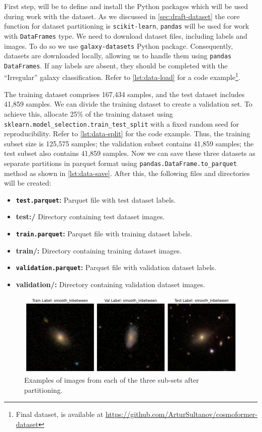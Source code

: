 First step, will be to define and install the Python packages which will be used during work with the dataset. As we discussed in \autoref{sec:draft-dataset} the core function for dataset partitioning is \texttt{scikit-learn}, \texttt{pandas} will be used for work with \texttt{DataFrames} type. We need to download dataset files, including labels and images. To do so we use \texttt{galaxy-datasets} Python package. Consequently, datasets are downloaded locally, allowing us to handle them using \texttt{pandas DataFrames}. If any labels are absent, they should be completed with the \enquote{Irregular} galaxy classification. Refer to \autoref{lst:data-load} for a code example\footnote{Final dataset, is available at \url{https://github.com/ArturSultanov/cosmoformer-dataset}}.

The training dataset comprises 167,434 samples, and the test dataset includes 41,859 samples. We can divide the training dataset to create a validation set. To achieve this, allocate 25\% of the training dataset using \texttt{sklearn.model\_selection.train\_test\_split} with a fixed random seed for reproducibility. Refer to  \autoref{lst:data-split} for the code example. Thus, the training subset size is 125,575 samples; the validation subset contains 41,859 samples; the test subset also contains 41,859 samples. Now we can save these three datasets as separate partitions in parquet format using \texttt{pandas.DataFrame.to\_parquet} method as shown in \autoref{lst:data-save}. After this, the following files and directories will be created:

\begin{itemize}
    \item \textbf{\texttt{test.parquet}:} Parquet file with test dataset labels.
    \item \textbf{test:/} Directory containing test dataset images.
    \item \textbf{\texttt{train.parquet}:} Parquet file with training dataset labels.
    \item \textbf{train/:} Directory containing training dataset images.
    \item \textbf{\texttt{validation.parquet}:} Parquet file with validation dataset labels.
    \item \textbf{validation/:} Directory containing validation dataset images.
\end{itemize}


\begin{figure}[htbp]\centering
  \centering
  \includegraphics[width=\linewidth]{obrazky-figures/05-implementation/final-dataset.png}
  \caption{Examples of images from each of the three sub-sets after partitioning.}
  \label{fig:final-dataset}
\end{figure}

